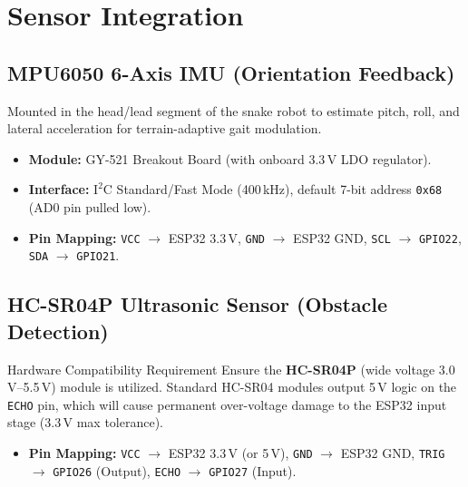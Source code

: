 \documentclass[11pt,a4paper]{article}
\begin{document}
\section{Sensor Integration}

\subsection{MPU6050 6-Axis IMU (Orientation Feedback)}
Mounted in the head/lead segment of the snake robot to estimate pitch, roll, and lateral acceleration for terrain-adaptive gait modulation.
\begin{itemize}[leftmargin=1.5em, itemsep=0.2em]
    \item \textbf{Module:} GY-521 Breakout Board (with onboard 3.3\,V LDO regulator).
    \item \textbf{Interface:} $\text{I}^2\text{C}$ Standard/Fast Mode (400\,kHz), default 7-bit address \texttt{0x68} (AD0 pin pulled low).
    \item \textbf{Pin Mapping:} \texttt{VCC} $\to$ ESP32 3.3\,V, \texttt{GND} $\to$ ESP32 GND, \texttt{SCL} $\to$ \texttt{GPIO22}, \texttt{SDA} $\to$ \texttt{GPIO21}.
\end{itemize}

\subsection{HC-SR04P Ultrasonic Sensor (Obstacle Detection)}
\begin{alertbox}{Hardware Compatibility Requirement}
Ensure the \textbf{HC-SR04P} (wide voltage 3.0\,V--5.5\,V) module is utilized. Standard HC-SR04 modules output 5\,V logic on the \texttt{ECHO} pin, which will cause permanent over-voltage damage to the ESP32 input stage ($3.3\,\text{V}$ max tolerance).
\end{alertbox}

\begin{itemize}[leftmargin=1.5em, itemsep=0.2em]
    \item \textbf{Pin Mapping:} \texttt{VCC} $\to$ ESP32 3.3\,V (or 5\,V), \texttt{GND} $\to$ ESP32 GND, \texttt{TRIG} $\to$ \texttt{GPIO26} (Output), \texttt{ECHO} $\to$ \texttt{GPIO27} (Input).
\end{itemize}
\end{document}
